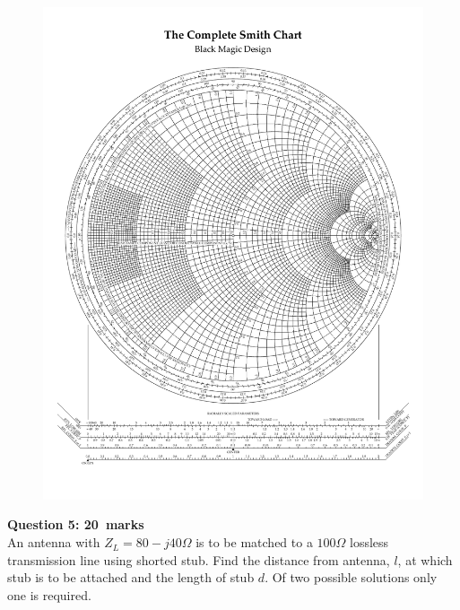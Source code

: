 \documentclass[12pt,a4paper]{article}
\def\Qfive{20}
\begin{document}
\begin{figure}[H]
\centering
\vspace{4cm}
\hspace*{-1.6cm}
\includegraphics[scale=1.0,trim=1cm 2cm 1cm 3cm, clip]{./SmithChart}
\label{fig:SmithChart1}
\end{figure}
\newpage
\noindent\textbf{Question 5: \hfill \Qfive~marks}\\
An antenna with $Z_L=80-j40\Omega$ is to be matched to a $100\Omega$ lossless transmission line using shorted stub. Find the distance from antenna, $l$, at which stub is to be attached and the length of stub $d$. Of two possible solutions only one is required.
\newpage
\end{document}
